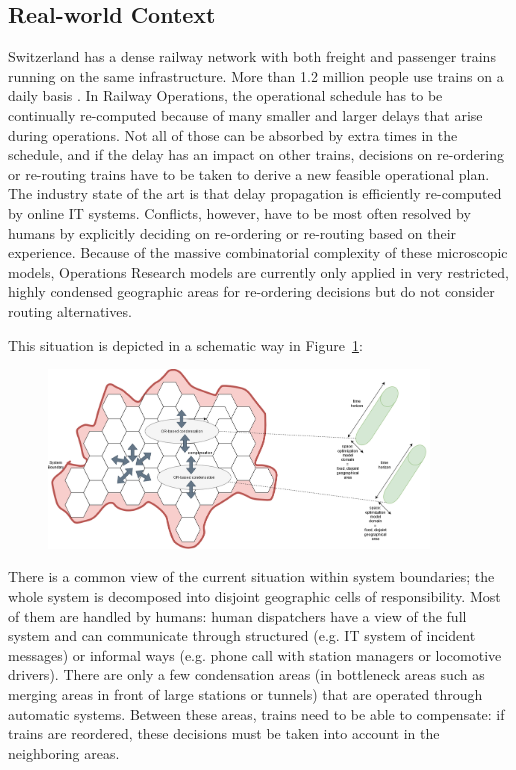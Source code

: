 \documentclass{article}
\begin{document}
\subsection{Real-world Context}
Switzerland has a dense railway network with both freight and passenger trains running on the same infrastructure. More than 1.2 million people use trains on a daily basis \cite{rcsbrochure}.
In Railway Operations, the operational schedule has to be continually re-computed because of many smaller and larger delays that arise during operations. Not all of those can be absorbed by extra times in the schedule, and if the delay has an impact on other trains, decisions on re-ordering or re-routing trains have to be taken to derive a new feasible operational plan. The industry state of the art is that delay propagation is efficiently re-computed by online IT systems. Conflicts, however, have to be most often resolved by humans by explicitly deciding on re-ordering or re-routing based on their experience. Because of the massive combinatorial complexity of these microscopic models, Operations Research models are currently only applied in very restricted, highly condensed geographic areas for re-ordering decisions but do not consider routing alternatives.



This situation is depicted in a schematic way in Figure~\ref{fig:introduction_compensation}:
%
\begin{figure}[ht]
	\centering
  \includegraphics[width=0.9\textwidth]{introduction_compensation.png}
	\caption{}
	\label{fig:introduction_compensation}
\end{figure}
%
There is a common view of the current situation within system boundaries; the whole system is decomposed into disjoint geographic cells of responsibility. Most of them are handled by humans: human dispatchers have a view of the full system and can communicate through structured (e.g. IT system of incident messages) or informal ways (e.g. phone call with station managers or locomotive drivers). There are only a few condensation areas \cite{caimi2009} (in bottleneck areas such as merging areas in front of large stations or tunnels) that are operated through automatic systems. Between these areas, trains need to be able to compensate: if trains are reordered, these decisions must be taken into account in the neighboring areas.
\end{document}
